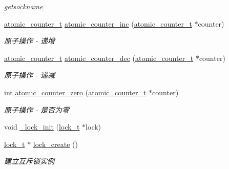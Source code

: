 \begin{DoxyCompactItemize}
\begin{DoxyCompactList}\small\item\em getsockname \end{DoxyCompactList}\item 
\hyperlink{a00050_a0d043bbb6b8db19fea54ab9271d352b6_a0d043bbb6b8db19fea54ab9271d352b6}{atomic\+\_\+counter\+\_\+t} \hyperlink{a00107_gade4f41f1cd519f2719b5114ce7801232_gade4f41f1cd519f2719b5114ce7801232}{atomic\+\_\+counter\+\_\+inc} (\hyperlink{a00050_a0d043bbb6b8db19fea54ab9271d352b6_a0d043bbb6b8db19fea54ab9271d352b6}{atomic\+\_\+counter\+\_\+t} $\ast$counter)
\begin{DoxyCompactList}\small\item\em 原子操作 -\/ 递增 \end{DoxyCompactList}\item 
\hyperlink{a00050_a0d043bbb6b8db19fea54ab9271d352b6_a0d043bbb6b8db19fea54ab9271d352b6}{atomic\+\_\+counter\+\_\+t} \hyperlink{a00107_gafc2df03d75cf9168b72e8c5e11953437_gafc2df03d75cf9168b72e8c5e11953437}{atomic\+\_\+counter\+\_\+dec} (\hyperlink{a00050_a0d043bbb6b8db19fea54ab9271d352b6_a0d043bbb6b8db19fea54ab9271d352b6}{atomic\+\_\+counter\+\_\+t} $\ast$counter)
\begin{DoxyCompactList}\small\item\em 原子操作 -\/ 递减 \end{DoxyCompactList}\item 
int \hyperlink{a00107_ga141897cac9743394a99ff7780daa6a80_ga141897cac9743394a99ff7780daa6a80}{atomic\+\_\+counter\+\_\+zero} (\hyperlink{a00050_a0d043bbb6b8db19fea54ab9271d352b6_a0d043bbb6b8db19fea54ab9271d352b6}{atomic\+\_\+counter\+\_\+t} $\ast$counter)
\begin{DoxyCompactList}\small\item\em 原子操作 -\/ 是否为零 \end{DoxyCompactList}\item 
void \hyperlink{a00081_aeea3ecc7113624673710e5f8570325c7_aeea3ecc7113624673710e5f8570325c7}{\+\_\+lock\+\_\+init} (\hyperlink{a00050_ad3e00e0eb0c79dfd77ff2ff833f49c7d_ad3e00e0eb0c79dfd77ff2ff833f49c7d}{lock\+\_\+t} $\ast$lock)
\item 
\hyperlink{a00050_ad3e00e0eb0c79dfd77ff2ff833f49c7d_ad3e00e0eb0c79dfd77ff2ff833f49c7d}{lock\+\_\+t} $\ast$ \hyperlink{a00081_a0e47279c8c752d22446932673be52e38_a0e47279c8c752d22446932673be52e38}{lock\+\_\+create} ()
\begin{DoxyCompactList}\small\item\em 建立互斥锁实例 \end{DoxyCompactList}\item 

\end{DoxyCompactItemize}
